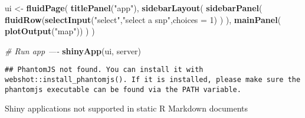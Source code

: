 \documentclass[]{article}
\newenvironment{Shaded}{\begin{snugshade}}{\end{snugshade}}
\newcommand{\KeywordTok}[1]{\textcolor[rgb]{0.13,0.29,0.53}{\textbf{#1}}}
\newcommand{\DataTypeTok}[1]{\textcolor[rgb]{0.13,0.29,0.53}{#1}}
\newcommand{\DecValTok}[1]{\textcolor[rgb]{0.00,0.00,0.81}{#1}}
\newcommand{\StringTok}[1]{\textcolor[rgb]{0.31,0.60,0.02}{#1}}
\newcommand{\CommentTok}[1]{\textcolor[rgb]{0.56,0.35,0.01}{\textit{#1}}}
\newcommand{\OtherTok}[1]{\textcolor[rgb]{0.56,0.35,0.01}{#1}}
\newcommand{\ControlFlowTok}[1]{\textcolor[rgb]{0.13,0.29,0.53}{\textbf{#1}}}
\newcommand{\OperatorTok}[1]{\textcolor[rgb]{0.81,0.36,0.00}{\textbf{#1}}}
\newcommand{\NormalTok}[1]{#1}
\begin{document}
\begin{Shaded}
\begin{Highlighting}[]
\NormalTok{ui <-}\StringTok{ }\KeywordTok{fluidPage}\NormalTok{(}
        \KeywordTok{titlePanel}\NormalTok{(}\StringTok{"app"}\NormalTok{),}
        \KeywordTok{sidebarLayout}\NormalTok{(}
          \KeywordTok{sidebarPanel}\NormalTok{(}
            \KeywordTok{fluidRow}\NormalTok{(}\KeywordTok{selectInput}\NormalTok{(}\StringTok{"select"}\NormalTok{,}\StringTok{"select a snp"}\NormalTok{,}\DataTypeTok{choices =} \DecValTok{1}\NormalTok{)}
\NormalTok{            )}
\NormalTok{          ),}
          \KeywordTok{mainPanel}\NormalTok{( }\KeywordTok{plotOutput}\NormalTok{(}\StringTok{"map"}\NormalTok{))}
\NormalTok{        )}
\NormalTok{      )}
\end{Highlighting}
\end{Shaded}

\begin{Shaded}
\end{Shaded}

\begin{Shaded}
\begin{Highlighting}[]
 \CommentTok{# Run app ----}
      \KeywordTok{shinyApp}\NormalTok{(ui, server)}
\end{Highlighting}
\end{Shaded}

\begin{verbatim}
## PhantomJS not found. You can install it with webshot::install_phantomjs(). If it is installed, please make sure the phantomjs executable can be found via the PATH variable.
\end{verbatim}

Shiny applications not supported in static R Markdown documents
\end{document}
